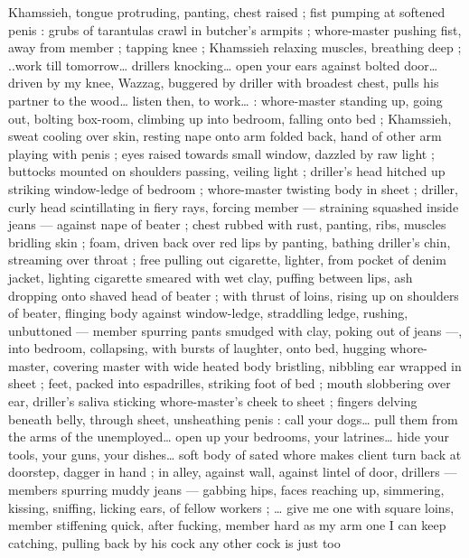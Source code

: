 {Khamssieh, tongue protruding, panting, chest raised ; fist pumping 
at softened penis{\td} : {\gl}{\td} grubs of tarantulas crawl in butcher's 
armpits{\td} {\gr} ; whore-master pushing fist, away from member ; tapping 
knee ; Khamssieh relaxing muscles, breathing deep ; {\gl}..work till 
tomorrow{\ldots} drillers knocking{\ldots} open your ears against bolted door{\ldots} 
driven by my knee, Wazzag, buggered by driller with broadest chest, 
pulls his partner to the wood{\ldots} listen then, to work{\ldots}{\gr} : whore-master 
standing up, going out, bolting box-room, climbing up into bedroom, 
falling onto bed ; Khamssieh, sweat cooling over skin, resting nape 
onto arm folded back, hand of other arm playing with penis ; eyes 
raised towards small window, dazzled by raw light ; buttocks mounted 
on shoulders passing, veiling light ; driller's head hitched up striking 
window-ledge of bedroom ; whore-master twisting body in sheet ; 
driller, curly head scintillating in fiery rays, forcing member --- 
straining squashed inside jeans --- against nape of beater ; chest 
rubbed with rust, panting, ribs, muscles bridling skin ; foam, driven 
back over red lips by panting, bathing driller's chin, streaming over 
throat ; free pulling out cigarette, lighter, from pocket of denim 
jacket, lighting cigarette smeared with wet clay, puffing between lips, 
ash dropping onto shaved head of beater ; with thrust of loins, rising 
up on shoulders of beater, flinging body against window-ledge, 
straddling ledge, rushing, unbuttoned --- member spurring pants 
smudged with clay, poking out of jeans ---, into bedroom, collapsing, 
with bursts of laughter, onto bed, hugging whore-master, covering 
master with wide heated body bristling, nibbling ear wrapped in sheet 
; feet, packed into espadrilles, striking foot of bed ; mouth 
slobbering over ear, driller's saliva sticking whore-master's cheek to 
sheet ; fingers delving beneath belly, through sheet, unsheathing 
penis :{\td} {\gl} call your dogs{\ldots} pull them from the arms of the 
unemployed{\ldots} open up your bedrooms, your latrines{\ldots} hide your 
tools, your guns, your dishes{\ldots} soft body of sated whore makes 
client turn back at doorstep, dagger in hand{\td} {\gr} ; in alley, against wall, 
against lintel of door, drillers --- members spurring muddy jeans --- 
gabbing hips, faces reaching up, simmering, kissing, sniffing, licking 
ears, of fellow workers ; {\ldots} {\gl}{\td} give me one with square loins, member 
stiffening quick, after fucking, member hard as my arm{\td} one I can 
keep catching, pulling back by his cock{\td} any other cock is just too 
}

